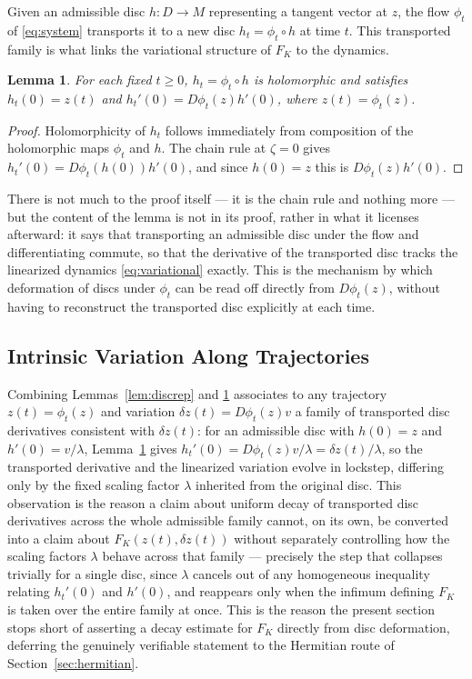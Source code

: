 \documentclass[preprint,12pt,authoryear]{elsarticle}
\newtheorem{lemma}{Lemma} %
\newtheorem{proof}{Proof}
\begin{document}
Given an admissible disc $h:D\to M$ representing a tangent vector at $z$, the flow $\phi_t$ of \eqref{eq:system} transports it to a new disc $h_t=\phi_t\circ h$ at time $t$. This transported family is what links the variational structure of $F_K$ to the dynamics.

\begin{lemma}
\label{lem:transport}
For each fixed $t\ge0$, $h_t=\phi_t\circ h$ is holomorphic and satisfies $h_t(0)=z(t)$ and $h_t'(0)=D\phi_t(z)h'(0)$, where $z(t)=\phi_t(z)$.
\end{lemma}

\begin{proof}
Holomorphicity of $h_t$ follows immediately from composition of the holomorphic maps $\phi_t$ and $h$. The chain rule at $\zeta=0$ gives $h_t'(0)=D\phi_t(h(0))h'(0)$, and since $h(0)=z$ this is $D\phi_t(z)h'(0)$.
\end{proof}

There is not much to the proof itself — it is the chain rule and nothing more — but the content of the lemma is not in its proof, rather in what it licenses afterward: it says that transporting an admissible disc under the flow and differentiating commute, so that the derivative of the transported disc tracks the linearized dynamics \eqref{eq:variational} exactly. This is the mechanism by which deformation of discs under $\phi_t$ can be read off directly from $D\phi_t(z)$, without having to reconstruct the transported disc explicitly at each time.

\subsection{Intrinsic Variation Along Trajectories}

Combining Lemmas~\ref{lem:discrep} and \ref{lem:transport} associates to any trajectory $z(t)=\phi_t(z)$ and variation $\delta z(t)=D\phi_t(z)v$ a family of transported disc derivatives consistent with $\delta z(t)$: for an admissible disc with $h(0)=z$ and $h'(0)=v/\lambda$, Lemma~\ref{lem:transport} gives $h_t'(0)=D\phi_t(z)v/\lambda=\delta z(t)/\lambda$, so the transported derivative and the linearized variation evolve in lockstep, differing only by the fixed scaling factor $\lambda$ inherited from the original disc. This observation is the reason a claim about uniform decay of transported disc derivatives across the whole admissible family cannot, on its own, be converted into a claim about $F_K(z(t),\delta z(t))$ without separately controlling how the scaling factors $\lambda$ behave across that family — precisely the step that collapses trivially for a single disc, since $\lambda$ cancels out of any homogeneous inequality relating $h_t'(0)$ and $h'(0)$, and reappears only when the infimum defining $F_K$ is taken over the entire family at once. This is the reason the present section stops short of asserting a decay estimate for $F_K$ directly from disc deformation, deferring the genuinely verifiable statement to the Hermitian route of Section~\ref{sec:hermitian}.
\end{document}
